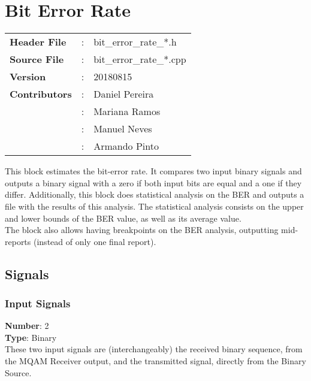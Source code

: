 \clearpage

\section{Bit Error Rate}
\label{sec:bit_error_rate}
\begin{refsection}

\begin{tcolorbox}	
\begin{tabular}{p{2.75cm} p{0.2cm} p{10.5cm}} 	
\textbf{Header File}    &:& bit\_error\_rate\_*.h \\
\textbf{Source File}    &:& bit\_error\_rate\_*.cpp \\
\textbf{Version}        &:& 20180815 \\
\textbf{Contributors}   &:& Daniel Pereira\\
                        &:& Mariana Ramos\\
                        &:& Manuel Neves\\
                        &:& Armando Pinto\\
\end{tabular}
\end{tcolorbox}
This block estimates the bit-error rate. 
It compares two input binary signals and outputs a binary signal with a zero if both input bits are equal and a one if they differ.
Additionally, this block does statistical analysis on the BER and outputs a file with the results of this analysis.
The statistical analysis consists on the upper and lower bounds of the BER value, as well as its average value.\\
The block also allows having breakpoints on the BER analysis, outputting mid-reports (instead of only one final report).

\subsection*{Signals}

\subsubsection*{Input Signals}

\hspace*{0.5in}\textbf{Number}: 2\\
\hspace*{0.5in}\textbf{Type}: Binary
\\
These two input signals are (interchangeably) the received binary sequence, from the MQAM Receiver output, and the transmitted signal, directly from the Binary Source.

\end{refsection}
